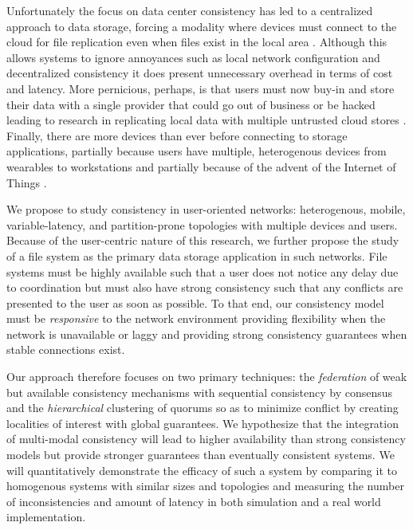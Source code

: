 \documentclass{article}
\begin{document}
Unfortunately the focus on data center consistency has led to a centralized approach to data storage, forcing a modality where devices must connect to the cloud for file replication even when files exist in the local area \cite{drago_inside_2012}. Although this allows systems to ignore annoyances such as local network configuration and decentralized consistency it does present unnecessary overhead in terms of cost and latency. More pernicious, perhaps, is that users must now buy-in and store their data with a single provider that could go out of business or be hacked leading to research in replicating local data with multiple untrusted cloud stores \cite{zhang_viewbox:_2014,feldman_sporc:_2010}. Finally, there are more devices than ever before connecting to storage applications, partially because users have multiple, heterogenous devices from wearables to workstations and partially because of the advent of the Internet of Things \cite{miorandi_internet_2012}.

We propose to study consistency in user-oriented networks: heterogenous, mobile, variable-latency, and partition-prone topologies with multiple devices and users. Because of the user-centric nature of this research, we further propose the study of a file system as the primary data storage application in such networks. File systems must be highly available such that a user does not notice any delay due to coordination but must also have strong consistency such that any conflicts are presented to the user as soon as possible. To that end, our consistency model must be \textit{responsive} to the network environment providing flexibility when the network is unavailable or laggy and providing strong consistency guarantees when stable connections exist.

Our approach therefore focuses on two primary techniques: the \textit{federation} of weak but available consistency mechanisms with sequential consistency by consensus and the \textit{hierarchical} clustering of quorums so as to minimize conflict by creating localities of interest with global guarantees. We hypothesize that the integration of multi-modal consistency will lead to higher availability than strong consistency models but provide stronger guarantees than eventually consistent systems. We will quantitatively demonstrate the efficacy of such a system by comparing it to homogenous systems with similar sizes and topologies and measuring the number of inconsistencies and amount of latency in both simulation and a real world implementation.
\end{document}
